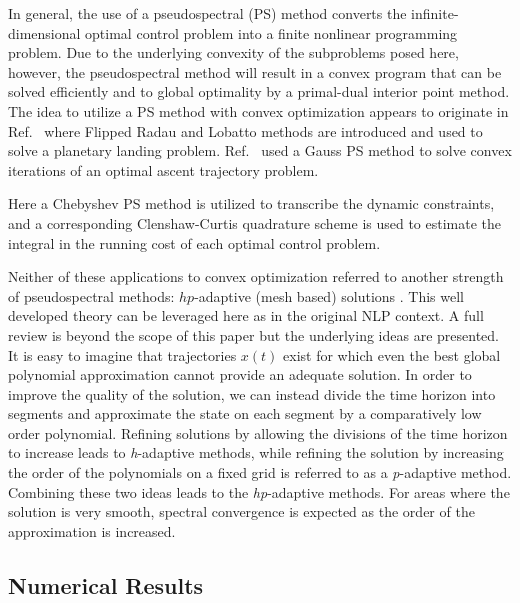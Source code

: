 \documentclass[10pt,a4paper]{article}
\begin{document}
	In general, the use of a pseudospectral (PS) method converts the infinite-dimensional optimal control problem into a finite nonlinear programming problem. Due to the underlying convexity of the subproblems posed here, however, the pseudospectral method will result in a convex program that can be solved efficiently and to global optimality by a primal-dual interior point method. The idea to utilize a PS method with convex optimization appears to originate in Ref.~\cite{PS_Convex} where Flipped Radau and Lobatto methods are introduced and used to solve a planetary landing problem. Ref.~\cite{PS_Convex_ascent} used a Gauss PS method to solve convex iterations of an optimal ascent trajectory problem. 
	
	Here a Chebyshev PS method is utilized to transcribe the dynamic constraints, and a corresponding Clenshaw-Curtis quadrature scheme is used to estimate the integral in the running cost of each optimal control problem.
	
	Neither of these applications to convex optimization referred to another strength of pseudospectral methods: $ hp $-adaptive (mesh based) solutions \cite{GPOPS,hp_adapt}. This well developed theory can be leveraged here as in the original NLP context. A full review is beyond the scope of this paper but the underlying ideas are presented. It is easy to imagine that trajectories $x(t)$ exist for which even the best global polynomial approximation cannot provide an adequate solution. In order to improve the quality of the solution, we can instead divide the time horizon into segments and approximate the state on each segment by a comparatively low order polynomial. Refining solutions by allowing the divisions of the time horizon to increase leads to \textit{h}-adaptive methods, while refining the solution by increasing the order of the polynomials on a fixed grid is referred to as a \textit{p}-adaptive method. Combining these two ideas leads to the \textit{hp}-adaptive methods. For areas where the solution is very smooth, spectral convergence is expected as the order of the approximation is increased.
	
	
	
	\subsection{Numerical Results}
\end{document}
